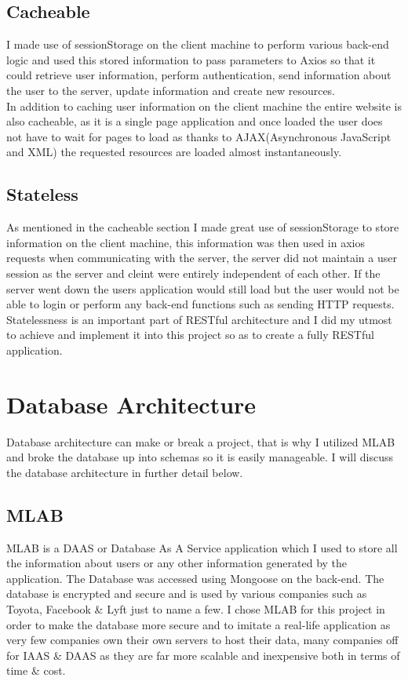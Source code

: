 \subsection{Cacheable}
I made use of sessionStorage on the client machine to perform various back-end logic and
used this stored information to pass parameters to Axios so that it could retrieve user information,
perform authentication, send information about the user to the server, update information and create new resources.
\\
In addition to caching user information on the client machine the entire website is also cacheable, as it is a single page
application and once loaded the user does not have to wait for pages to load as thanks to AJAX(Asynchronous JavaScript and XML)
the requested resources are loaded almost instantaneously.
\subsection{Stateless}
As mentioned in the cacheable section I made great use of sessionStorage to store information on the client machine, this information was then used in axios requests when communicating with the server, the server did not maintain a user session as the server and cleint were entirely independent of each other.  If the server went down the users application would still load but the user would not be able to login or perform any back-end functions such as sending HTTP requests.  Statelessness is an important part of RESTful architecture and I did my utmost to achieve and implement it into this project so as to create a fully RESTful application.
\section{Database Architecture}
Database architecture can make or break a project, that is why I utilized MLAB and broke the database up into schemas so it is easily manageable.  I will discuss the database architecture in further detail below.
\subsection{MLAB}
MLAB is a DAAS or Database As A Service application which I used to store all the information about users or any other information
generated by the application.  The Database was accessed using Mongoose on the back-end.  The database is encrypted and secure and is used by
various companies such as Toyota, Facebook \& Lyft just to name a few.  I chose MLAB for this project in order to make the database more secure
and to imitate a real-life application as very few companies own their own servers to host their data, many companies off for IAAS \& DAAS as they are far more scalable and inexpensive both in terms of time \& cost.
